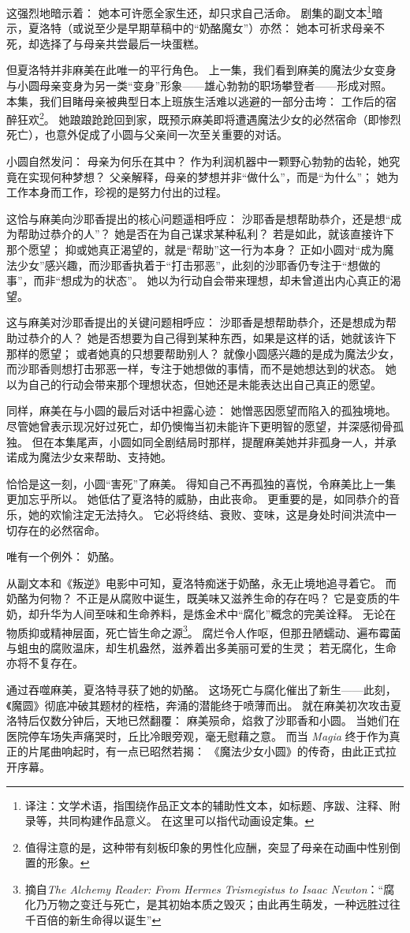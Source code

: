 这强烈地暗示着：
她本可许愿全家生还，却只求自己活命。
剧集的副文本\footnote{%
    译注：文学术语，指围绕作品正文本的辅助性文本，如标题、序跋、注释、附录等，共同构建作品意义。
    在这里可以指代动画设定集。
}暗示，夏洛特（或说至少是早期草稿中的“奶酪魔女”）亦然：
她本可祈求母亲不死，却选择了与母亲共尝最后一块蛋糕\cite{ref26}。

但夏洛特并非麻美在此唯一的平行角色。
上一集，我们看到麻美的魔法少女变身与小圆母亲变身为另一类“变身”形象——雄心勃勃的职场攀登者——形成对照。
本集，我们目睹母亲被典型日本上班族生活难以逃避的一部分击垮：
工作后的宿醉狂欢\footnote{%
    值得注意的是，这种带有刻板印象的男性化应酬，突显了母亲在动画中性别倒置的形象。
}\cite{ref27}。
她踉踉跄跄回到家，既预示麻美即将遭遇魔法少女的必然宿命（即惨烈死亡），也意外促成了小圆与父亲间一次至关重要的对话。

小圆自然发问：
母亲为何乐在其中？
作为利润机器中一颗野心勃勃的齿轮，她究竟在实现何种梦想？
父亲解释，母亲的梦想并非“做什么”，而是“为什么”；
她为工作本身而工作，珍视的是努力付出的过程。

这恰与麻美向沙耶香提出的核心问题遥相呼应：
沙耶香是想帮助恭介，还是想“成为帮助过恭介的人”？
她是否在为自己谋求某种私利？
若是如此，就该直接许下那个愿望；
抑或她真正渴望的，就是“帮助”这一行为本身？
正如小圆对“成为魔法少女”感兴趣，而沙耶香执着于“打击邪恶”，此刻的沙耶香仍专注于“想做的事”，而非“想成为的状态”。
她以为行动自会带来理想，却未曾道出内心真正的渴望。

这与麻美对沙耶香提出的关键问题相呼应：
沙耶香是想帮助恭介，还是想成为帮助过恭介的人？
她是否想要为自己得到某种东西，如果是这样的话，她就该许下那样的愿望；
或者她真的只想要帮助别人？
就像小圆感兴趣的是成为魔法少女，而沙耶香则想打击邪恶一样，专注于她想做的事情，而不是她想达到的状态。
她以为自己的行动会带来那个理想状态，但她还是未能表达出自己真正的愿望。

同样，麻美在与小圆的最后对话中袒露心迹：
她憎恶因愿望而陷入的孤独境地。
尽管她曾表示现况好过死亡，却仍懊悔当初未能许下更明智的愿望，并深感彻骨孤独。
但在本集尾声，小圆如同全剧结局时那样，提醒麻美她并非孤身一人，并承诺成为魔法少女来帮助、支持她。

恰恰是这一刻，小圆“害死”了麻美。
得知自己不再孤独的喜悦，令麻美比上一集更加忘乎所以。
她低估了夏洛特的威胁，由此丧命。
更重要的是，如同恭介的音乐，她的欢愉注定无法持久。
它必将终结、衰败、变味，这是身处时间洪流中一切存在的必然宿命。

唯有一个例外：
奶酪。

从副文本和《叛逆》电影中可知，夏洛特痴迷于奶酪，永无止境地追寻着它。
而奶酪为何物？
不正是从腐败中诞生，既美味又滋养生命的存在吗？
它是变质的牛奶，却升华为人间至味和生命养料，是炼金术中“腐化”概念的完美诠释。
无论在物质抑或精神层面，死亡皆生命之源\footnote{%
    摘自\emph{The Alchemy Reader: From Hermes Trismegistus to Isaac Newton}：“腐化乃万物之变迁与死亡，是其初始本质之毁灭；由此再生萌发，一种远胜过往千百倍的新生命得以诞生”
}\cite{ref28}。
腐烂令人作呕，但那丑陋蠕动、遍布霉菌与蛆虫的腐败温床，却生机盎然，滋养着出多美丽可爱的生灵；
若无腐化，生命亦将不复存在。

通过吞噬麻美，夏洛特寻获了她的奶酪。
这场死亡与腐化催出了新生——此刻，《魔圆》彻底冲破其题材的桎梏，奔涌的潜能终于喷薄而出。
就在麻美初次攻击夏洛特后仅数分钟后，天地已然翻覆：
麻美殒命，焰救了沙耶香和小圆。
当她们在医院停车场失声痛哭时，丘比冷眼旁观，毫无慰藉之意。
而当 \emph{Magia} 终于作为真正的片尾曲响起时，有一点已昭然若揭：
《魔法少女小圆》的传奇，由此正式拉开序幕。
